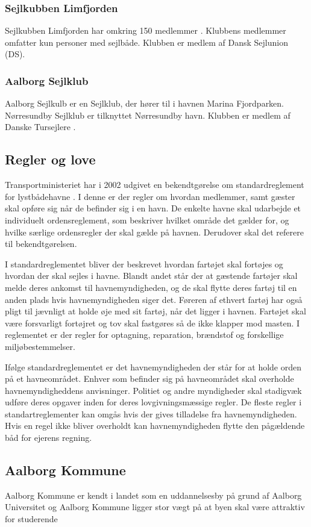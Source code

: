 \subsubsection{Sejlkubben Limfjorden}
Sejlkubben Limfjorden har omkring 150 medlemmer \cite{int_vb_sl}. Klubbens medlemmer omfatter kun personer med sejlbåde. Klubben er medlem af Dansk Sejlunion (DS).

\subsubsection{Aalborg Sejlklub}
Aalborg Sejlkulb er en Sejlklub, der hører til i havnen Marina Fjordparken. Nørresundby Sejlklub er tilknyttet Nørresundby havn. Klubben er medlem af Danske Tursejlere \cite{norresundby_sejlklub}.

\subsection{Regler og love}
Transportministeriet har i 2002 udgivet en bekendtgørelse om standardreglement for lystbådehavne \cite{standardreglement}. I denne er der regler om hvordan medlemmer, samt gæster skal opføre sig når de befinder sig i en havn. De enkelte havne skal udarbejde et individuelt ordensreglement, som beskriver hvilket område det gælder for, og hvilke særlige ordensregler der skal gælde på havnen. Derudover skal det referere til bekendtgørelsen.

I standardreglementet bliver der beskrevet hvordan fartøjet skal fortøjes og hvordan der skal sejles i havne. Blandt andet står der at gæstende fartøjer skal melde deres ankomst til havnemyndigheden, og de skal flytte deres fartøj til en anden plads hvis havnemyndigheden siger det. Føreren af ethvert fartøj har også pligt til jævnligt at holde øje med sit fartøj, når det ligger i havnen. Fartøjet skal være forsvarligt fortøjret og tov skal fastgøres så de ikke klapper mod masten. I reglementet er der regler for optagning, reparation, brændstof og forskellige miljøbestemmelser.

Ifølge standardreglementet er det havnemyndigheden der står for at holde orden på et havneområdet. Enhver som befinder sig på havneområdet skal overholde havnemyndigheddens anvisninger. Politiet og andre myndigheder skal stadigvæk udføre deres opgaver inden for deres lovgivningsmæssige regler. De fleste regler i standartreglementer kan omgås hvis der gives tilladelse fra havnemyndigheden. Hvis en regel ikke bliver overholdt kan havnemyndigheden flytte den pågældende båd for ejerens regning.


\subsection{Aalborg Kommune}
Aalborg Kommune er kendt i landet som en uddannelsesby på grund af Aalborg Universitet og Aalborg Kommune ligger stor vægt på at byen skal være attraktiv for studerende \cite{udd-strat-aalborg}
